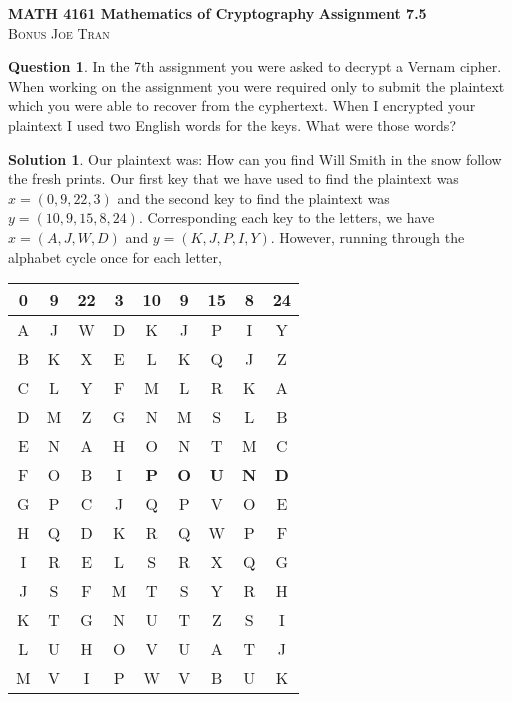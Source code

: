 \documentclass[11pt]{article}
\theoremstyle{definition}\newtheorem{definition}{Definition}
\theoremstyle{definition}\newtheorem{question}{Question}
\theoremstyle{definition}\newtheorem*{solution}{Solution}
\theoremstyle{definition}\newtheorem{example}{Example}
\theoremstyle{definition}\newtheorem{notation}{Notation}
\theoremstyle{theorem}\newtheorem{theorem}{Theorem}
\theoremstyle{theorem}\newtheorem{corollary}{Corollary}
\theoremstyle{theorem}\newtheorem{lemma}{Lemma}
\theoremstyle{theorem}\newtheorem{proposition}{Proposition}
\begin{document}
\noindent \textbf{MATH 4161 Mathematics of Cryptography} \hfill \textbf{Assignment 7.5} \\
\textsc{Bonus} \hfill \textsc{Joe Tran}

\begin{question}
    In the 7th assignment you were asked to decrypt a Vernam cipher. When working on the assignment you were required only to submit the plaintext which you were able to recover from the cyphertext. When I encrypted your plaintext I used two English words for the keys. What were those words?
\end{question}

\begin{solution}
    Our plaintext was: \textsf{How can you find Will Smith in the snow follow the fresh prints}. Our first key that we have used to find the plaintext was $x = (0, 9, 22, 3)$ and the second key to find the plaintext was $y = (10, 9, 15, 8, 24)$. Corresponding each key to the letters, we have $x = (A, J, W, D)$ and $y = (K, J, P, I, Y)$. However, running through the alphabet cycle once for each letter,
    \begin{center}
        \begin{tabular}{|c|c|c|c||c|c|c|c|c|} \hline
            0 & 9 & 22 & 3 & 10 & 9 & 15 & 8 & 24 \\ \hline\hline
            A & J & W & D & K & J & P & I & Y \\ \hline
            B & K & X & E & L & K & Q & J & Z \\ \hline
            C & L & Y & F & M & L & R & K & A \\ \hline
            D & M & Z & G & N & M & S & L & B \\ \hline
            E & N & A & H & O & N & T & M & C \\ \hline
            F & O & B & I & \textbf{P} & \textbf{O} & \textbf{U} & \textbf{N} & \textbf{D} \\ \hline
            G & P & C & J & Q & P & V & O & E \\ \hline
            H & Q & D & K & R & Q & W & P & F \\ \hline
            I & R & E & L & S & R & X & Q & G \\ \hline
            J & S & F & M & T & S & Y & R & H \\ \hline
            K & T & G & N & U & T & Z & S & I \\ \hline
            L & U & H & O & V & U & A & T & J \\ \hline
            M & V & I & P & W & V & B & U & K \\ \hline

\end{tabular}
\end{center}
\end{solution}
\end{document}
